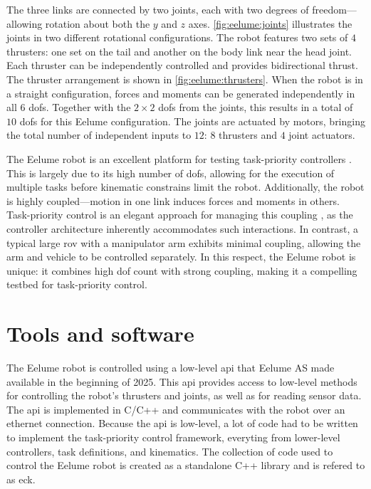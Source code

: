 The three links are connected by two joints, each with two degrees of freedom—
allowing rotation about both the $y$ and $z$ axes. \autoref{fig:eelume:joints} 
illustrates the joints in two different rotational configurations. The robot 
features two sets of $4$ thrusters: one set on the tail and another on the 
body link near the head joint. Each thruster can be independently controlled 
and provides bidirectional thrust. The thruster arrangement is shown in
\autoref{fig:eelume:thrusters}. When the robot is in a straight configuration, 
forces and moments can be generated independently in all $6$ \gls{dof}s. 
Together with the $2 \times 2$ \gls{dof}s from the joints, this results in a 
total of $10$ \gls{dof}s for this Eelume configuration. The joints are 
actuated by motors, bringing the total number of independent inputs to $12$:
$8$ thrusters and $4$ joint actuators.

The Eelume robot is an excellent platform for testing task-priority controllers
. This is largely due to its high number of \gls{dof}s, allowing for the 
execution of multiple tasks before kinematic constrains limit the robot. Additionally, 
the robot is highly coupled—motion in one link induces forces and moments in 
others. Task-priority control is an elegant approach for managing this coupling
, as the controller architecture inherently accommodates such interactions. In 
contrast, a typical large \gls{rov} with a manipulator arm exhibits minimal 
coupling, allowing the arm and vehicle to be controlled separately. In this 
respect, the Eelume robot is unique: it combines high \gls{dof} count with 
strong coupling, making it a compelling testbed for task-priority control.

\section{Tools and software}

The Eelume robot is controlled using a low-level \gls{api} that Eelume AS made
available in the beginning of 2025. This api provides access to low-level methods
for controlling the robot's thrusters and joints, as well as for reading sensor
data. The \gls{api} is implemented in C/C++ and communicates with the robot over
an ethernet connection. Because the \gls{api} is low-level, a lot of code had
to be written to implement the task-priority control framework, everyting from
lower-level controllers, task definitions, and kinematics. The collection of
code used to control the Eelume robot is created as a standalone C++ library
and is refered to as \gls{eck}.

